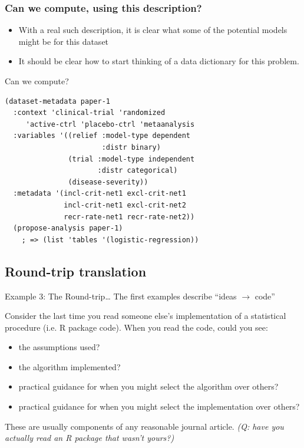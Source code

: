 \documentclass{beamer}
\begin{document}
\begin{frame}
  \frametitle{Can we compute, using this description?}
  \begin{itemize}
  \item With a real such description, it is clear what some of the
    potential models might be for this dataset
  \item It should be clear how to start thinking of a data dictionary
    for this problem.
  \end{itemize}
\end{frame}

\begin{frame}[fragile]{Can we compute?}
\begin{verbatim}
(dataset-metadata paper-1
  :context 'clinical-trial 'randomized 
     'active-ctrl 'placebo-ctrl 'metaanalysis
  :variables '((relief :model-type dependent
                       :distr binary)
               (trial :model-type independent
                      :distr categorical)
               (disease-severity))
  :metadata '(incl-crit-net1 excl-crit-net1
              incl-crit-net1 excl-crit-net2
              recr-rate-net1 recr-rate-net2))
  (propose-analysis paper-1)
    ; => (list 'tables '(logistic-regression))
\end{verbatim}
\end{frame}

\subsection{Round-trip translation}


\begin{frame}{Example 3: The Round-trip\ldots} 
  \label{example3}
  The first examples describe ``ideas $\rightarrow$ code''

  Consider the last time you read someone else's implementation of a
  statistical procedure (i.e. R package code).  When you read the
  code, could you see:
  \begin{itemize}
  \item the assumptions used?
  \item the algorithm implemented?
  \item practical guidance for when you might select the algorithm
    over others? 
  \item practical guidance for when you might select the
    implementation over others? 
  \end{itemize}
  These are usually components of any reasonable journal article.
  \textit{(Q: have you actually read an R package that wasn't yours?)}
\end{frame}
\end{document}

